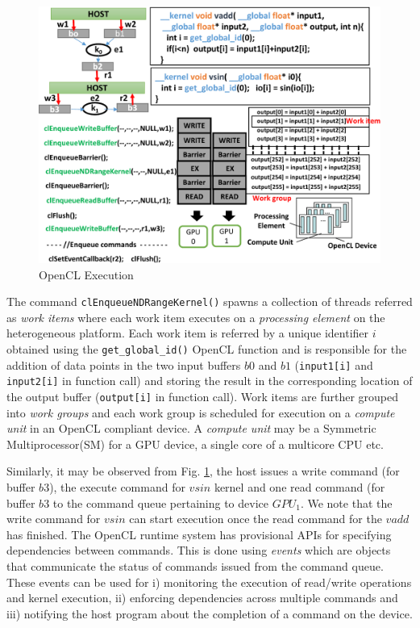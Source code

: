 	\begin{figure}[ht]  
		\centering
		\includegraphics[scale=0.47]{Pictures/OpenCLBackground.pdf}
		\caption{OpenCL Execution \label{fig:OpenCLArch}}
	\end{figure}
	\par The command {\tt clEnqueueNDRangeKernel()} spawns a collection of threads referred as \textit{work items} where each work item executes on a \textit{processing element} on the heterogeneous platform. Each work item is referred by a unique identifier $i$ obtained using the {\tt get\_global\_id()} OpenCL function and is responsible for the addition of  data points in the two input buffers $b0$ and $b1$ ({\tt input1[i]} and {\tt input2[i]} in function call) and storing the result in the corresponding location of the output buffer ({\tt output[i]} in function call). Work items are further grouped into \textit{work groups} and each work group is scheduled for execution on a \textit{compute unit} in an OpenCL compliant device. A \textit{compute unit} may be a Symmetric Multiprocessor(SM) for a GPU device, a single core of a multicore CPU etc. 
	\par Similarly, it may be observed from Fig. \ref{fig:OpenCLArch}, the host issues a write command (for buffer $b3$), the execute command for $vsin$ kernel and one read command (for buffer $b3$ to the command queue pertaining to device $GPU_1$. We note that the write command for $vsin$ can start execution once the read command for the $vadd$ has finished. The OpenCL runtime system  has provisional APIs for specifying dependencies between commands. This is done using {\em events} which are objects that communicate the status of commands issued from the command queue. These events can be used for i) monitoring the execution of read/write operations and kernel execution, ii) enforcing dependencies across multiple commands and iii) notifying the host program about the completion of a command on the device. 
